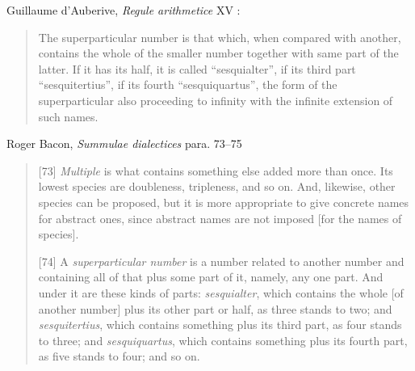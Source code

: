 \documentclass{amsart}
\theoremstyle{definition}
\begin{document}
Guillaume d'Auberive, {\em Regule arithmetice} XV \cite[p.~109]{gersh}:

\begin{quote}
The superparticular number is that which, when compared with
another, contains the whole of the smaller number together with same part
of the latter. If it has its half, it is called ``sesquialter'', if its third part ``sesquitertius'',
if its fourth ``sesquiquartus'', the form of the superparticular
also proceeding to infinity with the infinite extension of such names.
\end{quote}

Roger Bacon, {\em Summulae dialectices} para. 73--75 \cite[pp.~43--44]{MST47}

\begin{quote}
[73] {\em Multiple} is what contains something else added more than once. Its lowest species are doubleness, tripleness, and so on. And, likewise, other species can be proposed, but it is more appropriate to give concrete names for abstract ones, since abstract names are not imposed [for the names of species].

[74] A {\em superparticular number} is a number related to another number and containing all of that plus some part of it, namely, any one part.
And under it are these kinds of parts: {\em sesquialter}, which contains the whole [of another number] plus its other part or half, as three stands to two; and {\em sesquitertius}, which contains something plus its third part, as four stands to three; and {\em sesquiquartus}, which contains something plus its fourth part, as five stands to four; and so on.


\end{quote}
\end{document}
